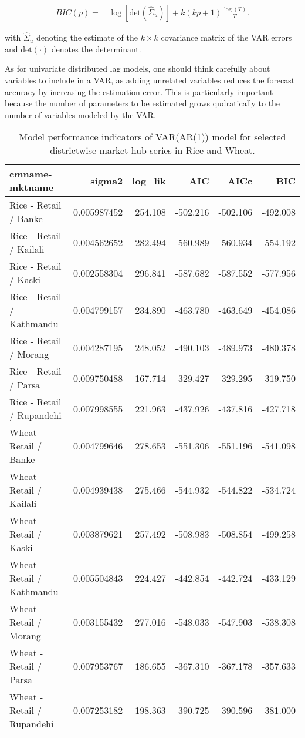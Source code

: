 \documentclass[
  12pt,
]{article}
\begin{document}
\[
\begin{aligned}
  BIC(p) =& \, \log\left[\text{det}(\widehat{\Sigma}_u)\right] + k(kp+1) \frac{\log(T)}{T}.
\end{aligned}
\]

with \(\widehat{\Sigma}_u\) denoting the estimate of the \(k \times k\) covariance matrix of the VAR errors and \(\text{det}(\cdot)\) denotes the determinant.

As for univariate distributed lag models, one should think carefully about variables to include in a VAR, as adding unrelated variables reduces the forecast accuracy by increasing the estimation error. This is particularly important because the number of parameters to be estimated grows qudratically to the number of variables modeled by the VAR.

\begin{longtable}[t]{lrrrrr}
\caption{\label{tab:retail-var-fit-tidy}Model performance indicators of VAR(AR(1)) model for selected districtwise market hub series in Rice and Wheat.}\\
\toprule
cmname-mktname & sigma2 & log\_lik & AIC & AICc & BIC\\
\midrule
Rice - Retail / Banke & 0.005987452 & 254.108 & -502.216 & -502.106 & -492.008\\
Rice - Retail / Kailali & 0.004562652 & 282.494 & -560.989 & -560.934 & -554.192\\
Rice - Retail / Kaski & 0.002558304 & 296.841 & -587.682 & -587.552 & -577.956\\
Rice - Retail / Kathmandu & 0.004799157 & 234.890 & -463.780 & -463.649 & -454.086\\
Rice - Retail / Morang & 0.004287195 & 248.052 & -490.103 & -489.973 & -480.378\\
\addlinespace
Rice - Retail / Parsa & 0.009750488 & 167.714 & -329.427 & -329.295 & -319.750\\
Rice - Retail / Rupandehi & 0.007998555 & 221.963 & -437.926 & -437.816 & -427.718\\
Wheat - Retail / Banke & 0.004799646 & 278.653 & -551.306 & -551.196 & -541.098\\
Wheat - Retail / Kailali & 0.004939438 & 275.466 & -544.932 & -544.822 & -534.724\\
Wheat - Retail / Kaski & 0.003879621 & 257.492 & -508.983 & -508.854 & -499.258\\
\addlinespace
Wheat - Retail / Kathmandu & 0.005504843 & 224.427 & -442.854 & -442.724 & -433.129\\
Wheat - Retail / Morang & 0.003155432 & 277.016 & -548.033 & -547.903 & -538.308\\
Wheat - Retail / Parsa & 0.007953767 & 186.655 & -367.310 & -367.178 & -357.633\\
Wheat - Retail / Rupandehi & 0.007253182 & 198.363 & -390.725 & -390.596 & -381.000\\
\bottomrule
\end{longtable}
\end{document}
